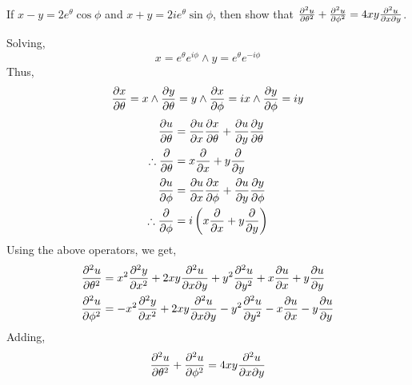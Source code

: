 \begin{asign}
	If $x-y=2e^\theta\cos\phi$ and $x+y=2ie^\theta\sin\phi$, then show that $\pdv[2]{u}{\theta}+\pdv[2]{u}{\phi}=4xy\pdv{u}{x}{y}$.
\end{asign}
\begin{anse}
	Solving,
	\[x=e^\theta e^{i\phi}\land y=e^\theta e^{-i\phi}\]
	Thus,
	\[\pdv{x}{\theta}=x\land \pdv{y}{\theta}=y\land \pdv{x}{\phi}=ix\land \pdv{y}{\phi}=iy\]
	\[\begin{split}
		\pdv{u}{\theta}&=\pdv{u}{x}\pdv{x}{\theta}+\pdv{u}{y}\pdv{y}{\theta}\\
		\therefore \pdv{\theta}&=x\pdv{x}+y\pdv{y}\\
		\pdv{u}{\phi}&=\pdv{u}{x}\pdv{x}{\phi}+\pdv{u}{y}\pdv{y}{\phi}\\
		\therefore \pdv{\phi}&=i\left( x\pdv{x}+y\pdv{y} \right)
	\end{split}\]
	Using the above operators, we get,
	\[\begin{split}
		\pdv[2]{u}{\theta}&=x^2\pdv[2]{y}{x}+2xy\pdv{u}{x}{y}+y^2\pdv[2]{u}{y}+x\pdv{u}{x}+y\pdv{u}{y}\\
		\pdv[2]{u}{\phi}&=-x^2\pdv[2]{y}{x}+2xy\pdv{u}{x}{y}-y^2\pdv[2]{u}{y}-x\pdv{u}{x}-y\pdv{u}{y}
	\end{split}\]
	Adding,
	\[\pdv[2]{u}{\theta}+\pdv[2]{u}{\phi}=4xy\pdv{u}{x}{y}\]
\end{anse}

